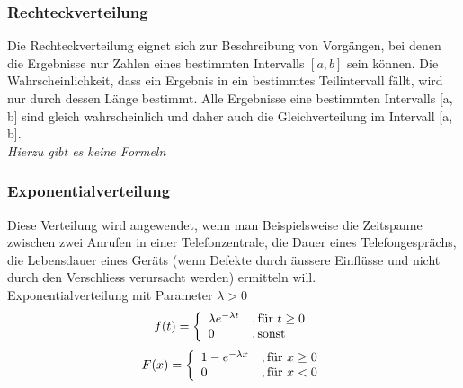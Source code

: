 \subsubsection{Rechteckverteilung}
Die Rechteckverteilung eignet sich zur Beschreibung von Vorgängen, bei denen die Ergebnisse nur Zahlen eines bestimmten Intervalls $[a, b]$ sein können. Die Wahrscheinlichkeit, dass ein Ergebnis in ein bestimmtes Teilintervall fällt, wird nur durch dessen Länge bestimmt. Alle Ergebnisse eine bestimmten Intervalls [a, b] sind gleich wahrscheinlich und daher auch die Gleichverteilung im Intervall [a, b].\\
\textit{Hierzu gibt es keine Formeln}
\subsubsection{Exponentialverteilung}
Diese Verteilung wird angewendet, wenn man Beispielsweise die Zeitspanne zwischen zwei Anrufen in einer Telefonzentrale, die Dauer eines Telefongesprächs, die Lebensdauer eines Geräts (wenn Defekte durch äussere Einflüsse und nicht durch den Verschliess verursacht werden) ermitteln will.\\
Exponentialverteilung mit Parameter $\lambda > 0$
\begin{equation}
f(t) = \left\{\begin{array}{l l} \lambda e^{-\lambda t}&, \mbox{für }t\geq 0\\ 0 &, \mbox{sonst}\end{array}\right.
\end{equation}
\begin{equation}
F(x) = \left\{\begin{array}{l l} 1-e^{-\lambda x}&,\mbox{für $x\geq 0$}\\ 0 &,\mbox{für }x < 0\end{array}\right.
\end{equation}
